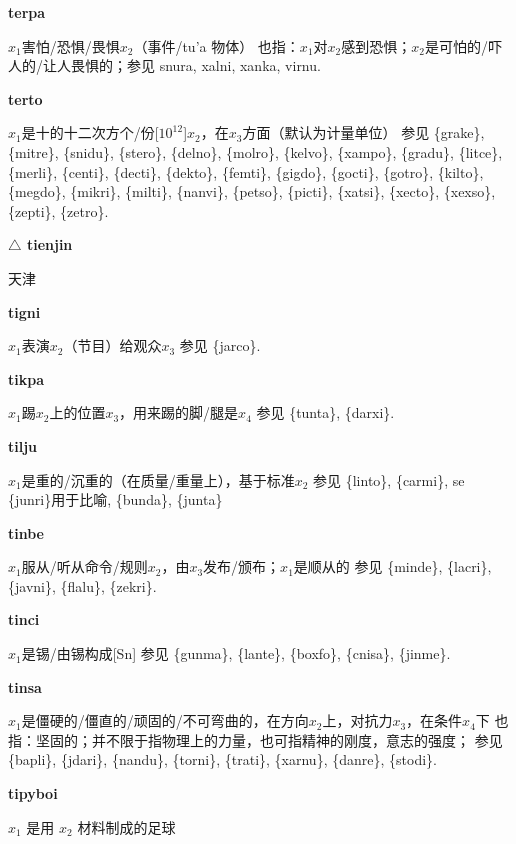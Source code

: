 \documentclass[notitlepage,twocolumn,a4paper,10pt]{book}
\begin{document}
{\sffamily\bfseries terpa}\enspace {\ttfamily\bfseries[tep     te'a]}  $x_1$害怕\slash{}恐惧\slash{}畏惧$x_2$（事件\slash{}tu'a 物体） \textemdash{} 也指：$x_1$对$x_2$感到恐惧；$x_2$是可怕的\slash{}吓人的\slash{}让人畏惧的；参见 {snura}, {xalni}, {xanka}, {virnu}.

{\sffamily\bfseries terto}\enspace {\ttfamily\bfseries[tet]}  $x_1$是十的十二次方个\slash{}份[$10^{12}$]$x_2$，在$x_3$方面（默认为计量单位） \textemdash{} 参见 \{grake\}, \{mitre\}, \{snidu\}, \{stero\}, \{delno\}, \{molro\}, \{kelvo\}, \{xampo\}, \{gradu\}, \{litce\}, \{merli\}, \{centi\}, \{decti\}, \{dekto\}, \{femti\}, \{gigdo\}, \{gocti\}, \{gotro\}, \{kilto\}, \{megdo\}, \{mikri\}, \{milti\}, \{nanvi\}, \{petso\}, \{picti\}, \{xatsi\}, \{xecto\}, \{xexso\}, \{zepti\}, \{zetro\}.

{\sffamily\bfseries $\triangle$ tienjin} 天津

{\sffamily\bfseries tigni}\enspace {\ttfamily\bfseries[tig]}  $x_1$表演$x_2$（节目）给观众$x_3$ \textemdash{} 参见 \{jarco\}.

{\sffamily\bfseries tikpa}\enspace {\ttfamily\bfseries[tip]}  $x_1$踢$x_2$上的位置$x_3$，用来踢的脚\slash{}腿是$x_4$ \textemdash{} 参见 \{tunta\}, \{darxi\}.

{\sffamily\bfseries tilju}\enspace {\ttfamily\bfseries[tij]}  $x_1$是重的\slash{}沉重的（在质量\slash{}重量上），基于标准$x_2$ \textemdash{} 参见 \{linto\}, \{carmi\}, se \{junri\}用于比喻, \{bunda\}, \{junta\}

{\sffamily\bfseries tinbe}\enspace {\ttfamily\bfseries[tib]}  $x_1$服从\slash{}听从命令\slash{}规则$x_2$，由$x_3$发布\slash{}颁布；$x_1$是顺从的 \textemdash{} 参见 \{minde\}, \{lacri\}, \{javni\}, \{flalu\}, \{zekri\}.

{\sffamily\bfseries tinci} $x_1$是锡\slash{}由锡构成[Sn] \textemdash{} 参见 \{gunma\}, \{lante\}, \{boxfo\}, \{cnisa\}, \{jinme\}.

{\sffamily\bfseries tinsa} $x_1$是僵硬的\slash{}僵直的\slash{}顽固的\slash{}不可弯曲的，在方向$x_2$上，对抗力$x_3$，在条件$x_4$下 \textemdash{} 也指：坚固的；并不限于指物理上的力量，也可指精神的刚度，意志的强度； 参见 \{bapli\}, \{jdari\}, \{nandu\}, \{torni\}, \{trati\}, \{xarnu\}, \{danre\}, \{stodi\}.

{\sffamily\bfseries tipyboi} $x_1$ 是用 $x_2$ 材料制成的足球
\end{document}
